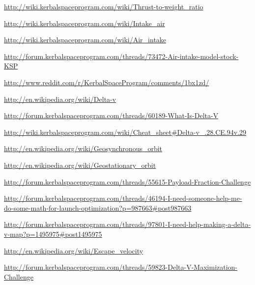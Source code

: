 \documentclass[11pt]{report}
\begin{document}
\begin{thebibliography}{Kerbin}
  \url{http://wiki.kerbalspaceprogram.com/wiki/Thrust-to-weight_ratio}

  \url{http://wiki.kerbalspaceprogram.com/wiki/Intake_air}

  \url{http://wiki.kerbalspaceprogram.com/wiki/Air_intake}

  \url{http://forum.kerbalspaceprogram.com/threads/73472-Air-intake-model-stock-KSP}

  \url{http://www.reddit.com/r/KerbalSpaceProgram/comments/1bx1zd/}

  \url{http://en.wikipedia.org/wiki/Delta-v}

  \url{http://forum.kerbalspaceprogram.com/threads/60189-What-Is-Delta-V}

  \url{http://wiki.kerbalspaceprogram.com/wiki/Cheat_sheet#Delta-v_.28.CE.94v.29}

  \url{http://en.wikipedia.org/wiki/Geosynchronous_orbit}

  \url{http://en.wikipedia.org/wiki/Geostationary_orbit}

  \url{http://forum.kerbalspaceprogram.com/threads/55615-Payload-Fraction-Challenge}

  \url{http://forum.kerbalspaceprogram.com/threads/46194-I-need-someone-help-me-do-some-math-for-launch-optimization?p=987663#post987663}

  \url{http://forum.kerbalspaceprogram.com/threads/97801-I-need-help-making-a-delta-v-map?p=1495975#post1495975}

  \url{http://en.wikipedia.org/wiki/Escape_velocity}

  \url{http://forum.kerbalspaceprogram.com/threads/59823-Delta-V-Maximization-Challenge}

\end{thebibliography}
\end{document}
